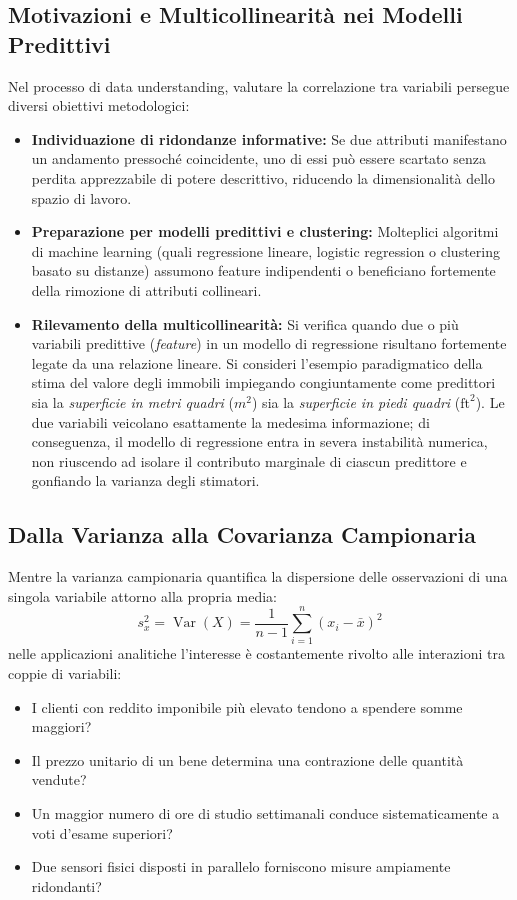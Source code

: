 \subsection{Motivazioni e Multicollinearit\`a nei Modelli Predittivi}
Nel processo di data understanding, valutare la correlazione tra variabili persegue diversi obiettivi metodologici:
\begin{itemize}
    \item \textbf{Individuazione di ridondanze informative:} Se due attributi manifestano un andamento pressoch\'e coincidente, uno di essi pu\`o essere scartato senza perdita apprezzabile di potere descrittivo, riducendo la dimensionalit\`a dello spazio di lavoro.
    \item \textbf{Preparazione per modelli predittivi e clustering:} Molteplici algoritmi di machine learning (quali regressione lineare, logistic regression o clustering basato su distanze) assumono feature indipendenti o beneficiano fortemente della rimozione di attributi collineari.
    \item \textbf{Rilevamento della multicollinearit\`a:} Si verifica quando due o pi\`u variabili predittive (\textit{feature}) in un modello di regressione risultano fortemente legate da una relazione lineare. Si consideri l'esempio paradigmatico della stima del valore degli immobili impiegando congiuntamente come predittori sia la \textit{superficie in metri quadri} ($m^2$) sia la \textit{superficie in piedi quadri} ($\text{ft}^2$). Le due variabili veicolano esattamente la medesima informazione; di conseguenza, il modello di regressione entra in severa instabilit\`a numerica, non riuscendo ad isolare il contributo marginale di ciascun predittore e gonfiando la varianza degli stimatori.
\end{itemize}

\subsection{Dalla Varianza alla Covarianza Campionaria}
Mentre la varianza campionaria quantifica la dispersione delle osservazioni di una singola variabile attorno alla propria media:
\begin{equation}
s_x^2 = \operatorname{Var}(X) = \frac{1}{n-1} \sum_{i=1}^n (x_i - \bar{x})^2
\end{equation}
nelle applicazioni analitiche l'interesse \`e costantemente rivolto alle interazioni tra coppie di variabili:
\begin{itemize}
    \item I clienti con reddito imponibile pi\`u elevato tendono a spendere somme maggiori?
    \item Il prezzo unitario di un bene determina una contrazione delle quantit\`a vendute?
    \item Un maggior numero di ore di studio settimanali conduce sistematicamente a voti d'esame superiori?
    \item Due sensori fisici disposti in parallelo forniscono misure ampiamente ridondanti?
\end{itemize}


